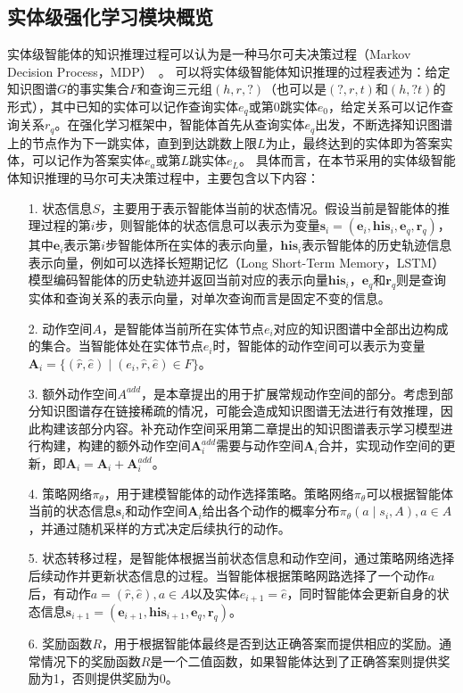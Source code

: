 \documentclass[algorithmlist, AutoFakeBold, AutoFakeSlant, figurelist, tablelist, nomlist, masters]{seuthesix}
\begin{document}
\subsection{实体级强化学习模块概览}
实体级智能体的知识推理过程可以认为是一种马尔可夫决策过程（Markov Decision Process，MDP）~\cite{gronauer2022multi}。
可以将实体级智能体知识推理的过程表述为：给定知识图谱$G$的事实集合$F$和查询三元组$(h, r, ?)$（也可以是$(?, r, t)$和$(h, ? t)$的形式），其中已知的实体可以记作查询实体$e_q$或第0跳实体$e_0$，给定关系可以记作查询关系$r_q$。在强化学习框架中，智能体首先从查询实体$e_q$出发，不断选择知识图谱上的节点作为下一跳实体，直到到达跳数上限$L$为止，最终达到的实体即为答案实体，可以记作为答案实体$e_a$或第$L$跳实体$e_L$。
具体而言，在本节采用的实体级智能体知识推理的马尔可夫决策过程中，主要包含以下内容：
\begin{itemize}
  \item [1.] 状态信息$S$，主要用于表示智能体当前的状态情况。假设当前是智能体的推理过程的第$i$步，则智能体的状态信息可以表示为变量$\bm{s}_i = (\bm{e}_i, \bm{his}_i, \bm{e}_q, \bm{r}_q)$，其中$\bm{e}_i$表示第$i$步智能体所在实体的表示向量，$\bm{his}_i$表示智能体的历史轨迹信息表示向量，例如可以选择长短期记忆（Long Short-Term Memory，LSTM）模型编码智能体的历史轨迹并返回当前对应的表示向量$\bm{his}_i$，$\bm{e}_q$和$\bm{r}_q$则是查询实体和查询关系的表示向量，对单次查询而言是固定不变的信息。
  \item [2.] 动作空间$A$，是智能体当前所在实体节点$e_i$对应的知识图谱中全部出边构成的集合。当智能体处在实体节点$e_i$时，智能体的动作空间可以表示为变量$\bm{A}_i = \{(\hat{r}, \hat{e}) \mid (e_i, \hat{r}, \hat{e}) \in F\}$。
  \item [3.] 额外动作空间$A^{add}$，是本章提出的用于扩展常规动作空间的部分。考虑到部分知识图谱存在链接稀疏的情况，可能会造成知识图谱无法进行有效推理，因此构建该部分内容。补充动作空间采用第二章提出的知识图谱表示学习模型进行构建，构建的额外动作空间$\bm{A}_{i}^{add}$需要与动作空间$\bm{A}_i$合并，实现动作空间的更新，即$\bm{A}_i = \bm{A}_i + \bm{A}_{i}^{add} $。
  \item [4.] 策略网络$\pi_\theta$，用于建模智能体的动作选择策略。策略网络$\pi_\theta$可以根据智能体当前的状态信息$\bm{s}_i$和动作空间$\bm{A}_i$给出各个动作的概率分布$\pi_\theta(a \mid s_i, A), a \in A$，并通过随机采样的方式决定后续执行的动作。
  \item [5.] 状态转移过程，是智能体根据当前状态信息和动作空间，通过策略网络选择后续动作并更新状态信息的过程。当智能体根据策略网路选择了一个动作$a$后，有动作$a = (\hat{r}, \hat{e}), a \in A$以及实体$e_{i+1}=\hat{e}$，同时智能体会更新自身的状态信息$\bm{s}_{i+1} = (\bm{e}_{i+1}, \bm{his}_{i+1}, \bm{e}_q, \bm{r}_q)$。
  \item [6.] 奖励函数$R$，用于根据智能体最终是否到达正确答案而提供相应的奖励。通常情况下的奖励函数$R$是一个二值函数，如果智能体达到了正确答案则提供奖励为1，否则提供奖励为0。
\end{itemize}
\end{document}
